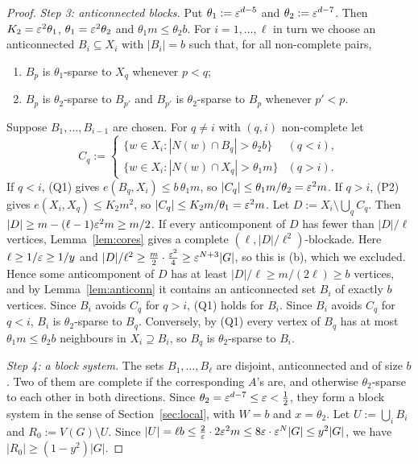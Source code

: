\begin{proof}
\emph{Step 3: anticonnected blocks.} Put $\theta_1:=\varepsilon^{d-5}$ and $\theta_2:=\varepsilon^{d-7}$. Then
$K_2=\varepsilon^2\theta_1$, $\theta_1=\varepsilon^2\theta_2$ and $\theta_1m\le\theta_2b$. For $i=1,\dots,\ell$ in turn we choose an
anticonnected $B_i\subseteq X_i$ with $|B_i|=b$ such that, for all non-complete pairs,
\begin{enumerate}[label=(Q\arabic*)]
\item $B_p$ is $\theta_1$-sparse to $X_q$ whenever $p<q$;
\item $B_p$ is $\theta_2$-sparse to $B_{p'}$ and $B_{p'}$ is $\theta_2$-sparse to $B_p$ whenever $p'<p$.
\end{enumerate}
Suppose $B_1,\dots,B_{i-1}$ are chosen. For $q\ne i$ with $(q,i)$ non-complete let
\[
C_q:=\begin{cases}\{w\in X_i:|N(w)\cap B_q|>\theta_2b\}&(q<i),\\ \{w\in X_i:|N(w)\cap X_q|>\theta_1m\}&(q>i).\end{cases}
\]
If $q<i$, (Q1) gives $e(B_q,X_i)\le b\,\theta_1m$, so $|C_q|\le\theta_1m/\theta_2=\varepsilon^2m$. If $q>i$, (P2) gives
$e(X_i,X_q)\le K_2m^2$, so $|C_q|\le K_2m/\theta_1=\varepsilon^2m$. Let $D:=X_i\setminus\bigcup_qC_q$. Then
$|D|\ge m-(\ell-1)\varepsilon^2m\ge m/2$. If every anticomponent of $D$ has fewer than $|D|/\ell$ vertices,
Lemma~\ref{lem:cores} gives a complete $(\ell,|D|/\ell^2)$-blockade. Here $\ell\ge1/\varepsilon\ge1/y$ and
$|D|/\ell^2\ge\frac m2\cdot\frac{\varepsilon^2}4\ge\varepsilon^{N+3}|G|$, so this is (b), which we excluded. Hence some
anticomponent of $D$ has at least $|D|/\ell\ge m/(2\ell)\ge b$ vertices, and by Lemma~\ref{lem:anticonn} it
contains an anticonnected set $B_i$ of exactly $b$ vertices. Since $B_i$ avoids $C_q$ for $q>i$, (Q1) holds
for $B_i$. Since $B_i$ avoids $C_q$ for $q<i$, $B_i$ is $\theta_2$-sparse to $B_q$. Conversely, by (Q1) every
vertex of $B_q$ has at most $\theta_1m\le\theta_2b$ neighbours in $X_i\supseteq B_i$, so $B_q$ is $\theta_2$-sparse to
$B_i$.

\emph{Step 4: a block system.} The sets $B_1,\dots,B_\ell$ are disjoint, anticonnected and of size $b$. Two
of them are complete if the corresponding $A$'s are, and otherwise $\theta_2$-sparse to each other in both
directions. Since $\theta_2=\varepsilon^{d-7}\le\varepsilon<\frac12$, they form a block system in the sense of
Section~\ref{sec:local}, with $W=b$ and $x=\theta_2$. Let $U:=\bigcup_iB_i$ and $R_0:=V(G)\setminus U$. Since
$|U|=\ell b\le\frac2{\varepsilon}\cdot2\varepsilon^2m\le8\varepsilon\cdot\varepsilon^N|G|\le y^2|G|$, we have $|R_0|\ge(1-y^2)|G|$.


\end{proof}
